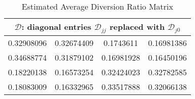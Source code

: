 
\begin{table}
\centering
\begin{tabular}{ |cccc| }
 \hline
\multicolumn{4}{|c|}{$\mathcal{D}$: diagonal entries $\mathcal{D}_{jj}$ replaced with $\mathcal{D}_{j0}$}
 \\
 \hline
 0.32908096 & 0.32674409 & 0.1743611 & 0.16981386   \\
0.34688774 & 0.31879102 & 0.16981928 & 0.16450196  \\
0.18220138 & 0.16573254 & 0.32424023 & 0.32782585  \\
0.18083009 & 0.16332965 & 0.33517888 & 0.32066138  \\
 \hline
\end{tabular}
\label{table5_4}
\caption{Estimated Average Diversion Ratio Matrix}
\end{table}

